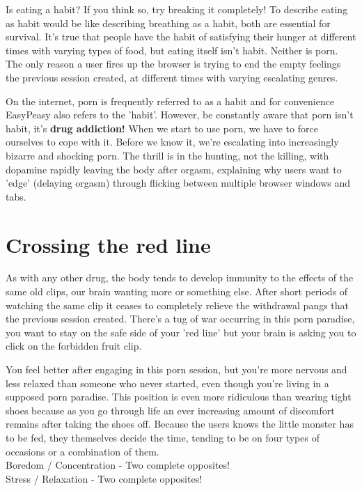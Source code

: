 \documentclass[
]{book}
\begin{document}
Is eating a habit? If you think so, try breaking it completely! To describe eating as habit would be like describing breathing as a habit, both are essential for survival. It's true that people have the habit of satisfying their hunger at different times with varying types of food, but eating itself isn't habit. Neither is porn. The only reason a user fires up the browser is trying to end the empty feelings the previous session created, at different times with varying escalating genres.

On the internet, porn is frequently referred to as a habit and for convenience EasyPeasy also refers to the 'habit'. However, be constantly aware that porn isn't habit, it's \textbf{drug addiction!} When we start to use porn, we have to force ourselves to cope with it. Before we know it, we're escalating into increasingly bizarre and shocking porn. The thrill is in the hunting, not the killing, with dopamine rapidly leaving the body after orgasm, explaining why users want to 'edge' (delaying orgasm) through flicking between multiple browser windows and tabs.

\hypertarget{crossing-the-red-line}{%
\section{Crossing the red line}\label{crossing-the-red-line}}

As with any other drug, the body tends to develop immunity to the effects of the same old clips, our brain wanting more or something else. After short periods of watching the same clip it ceases to completely relieve the withdrawal pangs that the previous session created. There's a tug of war occurring in this porn paradise, you want to stay on the safe side of your 'red line' but your brain is asking you to click on the forbidden fruit clip.

You feel better after engaging in this porn session, but you're more nervous and less relaxed than someone who never started, even though you're living in a supposed porn paradise. This position is even more ridiculous than wearing tight shoes because as you go through life an ever increasing amount of discomfort remains after taking the shoes off. Because the users knows the little monster has to be fed, they themselves decide the time, tending to be on four types of occasions or a combination of them.\\
Boredom / Concentration - Two complete opposites!\\
Stress / Relaxation - Two complete opposites!
\end{document}
